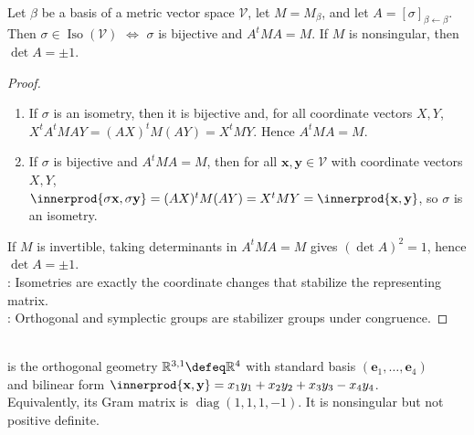 \begin{proposition} \label{prop:matrix-criterion-for-metric-isometries} \\
Let $\beta$ be a basis of a metric vector space $\mathcal{V}$, let $M=M_{\beta}$, and let $A=[\sigma]_{\beta\leftarrow\beta}$.\\
Then $\sigma\in\operatorname{Iso}(\mathcal{V})$ $\iff$ $\sigma$ is bijective and $A^tMA=M$. If $M$ is nonsingular, then $\det A=\pm1$.
\begin{proof}
\begin{enumerate}[label=\roman*.]
\setlength{\itemsep}{0pt}
\item[$(\Rightarrow)$] If $\sigma$ is an isometry, then it is bijective and, for all coordinate vectors $X,Y$,\\
$X^tA^tMAY=(AX)^tM(AY)=X^tMY$. Hence $A^tMA=M$.
\item[$(\Leftarrow)$] If $\sigma$ is bijective and $A^tMA=M$, then for all $\mathbf{x},\mathbf{y}\in\mathcal{V}$ with coordinate vectors $X,Y$,\\
$\innerprod{\sigma\mathbf{x},\sigma\mathbf{y}} =(AX)^tM(AY) =X^tMY =\innerprod{\mathbf{x},\mathbf{y}}$, so $\sigma$ is an isometry.
\end{enumerate}
If $M$ is invertible, taking determinants in $A^tMA=M$ gives $(\det A)^2=1$, hence $\det A=\pm1$.\\
: Isometries are exactly the coordinate changes that stabilize the representing matrix.\\
: Orthogonal and symplectic groups are stabilizer groups under congruence.
\end{proof}
\end{proposition}

\begin{definition} \label{def:minkowski-metric-vector-space} \\
 is the orthogonal geometry $\mathbb{R}^{3,1}\defeq\mathbb{R}^4$ with standard basis $(\mathbf{e}_1,\ldots,\mathbf{e}_4)$\\
and bilinear form $\innerprod{\mathbf{x},\mathbf{y}} =x_1y_1+x_2y_2+x_3y_3-x_4y_4$.\\
Equivalently, its Gram matrix is $\operatorname{diag}(1,1,1,-1)$. It is nonsingular but not positive definite.
\end{definition}

